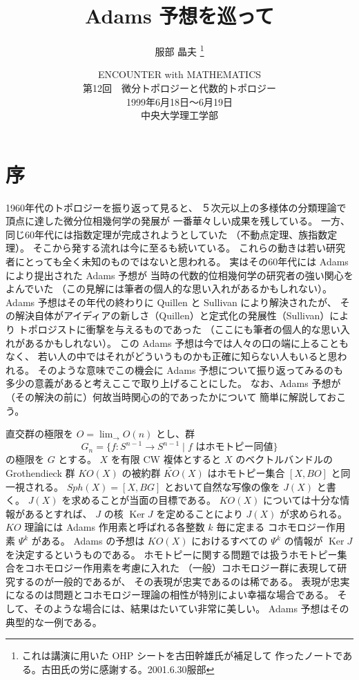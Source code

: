 \documentclass[uplatex,dvipdfmx,a4paper,12pt]{jlreq}
\newcommand{\Ker}{\operatorname{Ker}}
\begin{document}
\title{Adams 予想を巡って}
\author{服部 晶夫%
  \thanks{これは講演に用いた OHP シートを古田幹雄氏が補足して
    作ったノートである。古田氏の労に感謝する。2001.6.30\quad 服部}}
\date{ENCOUNTER with MATHEMATICS\\
  第12回　微分トポロジーと代数的トポロジー\\
  1999年6月18日〜6月19日\\
  中央大学理工学部}

\maketitle

\section{序}

1960年代のトポロジーを振り返って見ると、
５次元以上の多様体の分類理論で頂点に達した微分位相幾何学の発展が
一番華々しい成果を残している。
一方、同じ60年代には指数定理が完成されようとしていた
（不動点定理、族指数定理）。
そこから発する流れは今に至るも続いている。
これらの動きは若い研究者にとっても全く未知のものではないと思われる。
実はその60年代には Adams により提出された Adams 予想が
当時の代数的位相幾何学の研究者の強い関心をよんでいた
（この見解には筆者の個人的な思い入れがあるかもしれない）。
Adams 予想はその年代の終わりに Quillen と Sullivan により解決されたが、
その解決自体がアイディアの新しさ（Quillen）と定式化の発展性（Sullivan）により
トポロジストに衝撃を与えるものであった
（ここにも筆者の個人的な思い入れがあるかもしれない）。
この Adams 予想は今では人々の口の端に上ることもなく、
若い人の中ではそれがどういうものかも正確に知らない人もいると思われる。
そのような意味でこの機会に Adams 予想について振り返ってみるのも
多少の意義があると考えここで取り上げることにした。
なお、Adams 予想が（その解決の前に）何故当時関心の的であったかについて
簡単に解説しておこう。

直交群の極限を $O = \displaystyle\lim_{\longrightarrow} O(n)$ とし、群
\[
  G_n = \{f : S^{n-1} \to S^{n-1} \mid f \text{ はホモトピー同値}\}
\]
の極限を $G$ とする。
$X$ を有限 CW 複体とすると $X$ のベクトルバンドルの Grothendieck 群
$KO(X)$ の被約群 $\widetilde{KO}(X)$ はホモトピー集合 $[X, BO]$ と同一視される。
$\mathit{Sph}(X) = [X, BG]$ とおいて自然な写像の像を $J(X)$ と書く。
$J(X)$ を求めることが当面の目標である。
$KO(X)$ については十分な情報があるとすれば、
$J$ の核 $\Ker J$ を定めることにより $J(X)$ が求められる。
$KO$ 理論には Adams 作用素と呼ばれる各整数 $k$ 毎に定まる
コホモロジー作用素 $\Psi^k$ がある。
Adams の予想は $KO(X)$ におけるすべての $\Psi^k$ の情報が
$\Ker J$ を決定するというものである。
ホモトピーに関する問題では扱うホモトピー集合をコホモロジー作用素を考慮に入れた
（一般）コホモロジー群に表現して研究するのが一般的であるが、
その表現が忠実であるのは稀である。
表現が忠実になるのは問題とコホモロジー理論の相性が特別によい幸福な場合である。
そして、そのような場合には、結果はたいてい非常に美しい。
Adams 予想はその典型的な一例である。
\end{document}
